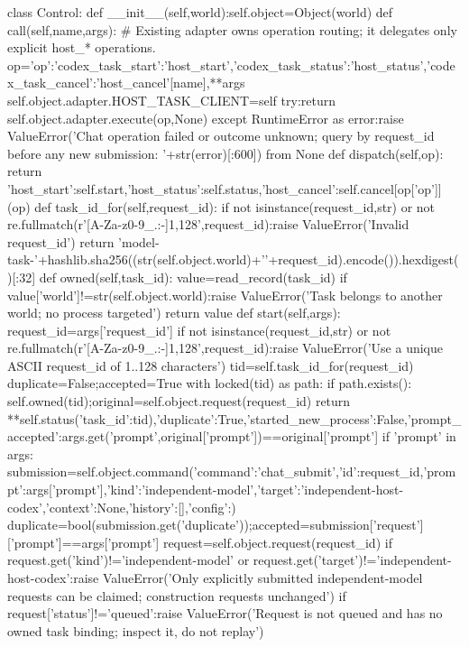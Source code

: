 class Control:
    def __init__(self,world):self.object=Object(world)
    def call(self,name,args):
        # Existing adapter owns operation routing; it delegates only explicit host_* operations.
        op={'op':{'codex_task_start':'host_start','codex_task_status':'host_status','codex_task_cancel':'host_cancel'}[name],**args}
        self.object.adapter.HOST_TASK_CLIENT=self
        try:return self.object.adapter.execute(op,None)
        except RuntimeError as error:raise ValueError('Chat operation failed or outcome unknown; query by request_id before any new submission: '+str(error)[:600]) from None
    def dispatch(self,op):
        return {'host_start':self.start,'host_status':self.status,'host_cancel':self.cancel}[op['op']](op)
    def task_id_for(self,request_id):
        if not isinstance(request_id,str) or not re.fullmatch(r'[A-Za-z0-9_.:-]{1,128}',request_id):raise ValueError('Invalid request_id')
        return 'model-task-'+hashlib.sha256((str(self.object.world)+'\0'+request_id).encode()).hexdigest()[:32]
    def owned(self,task_id):
        value=read_record(task_id)
        if value['world']!=str(self.object.world):raise ValueError('Task belongs to another world; no process targeted')
        return value
    def start(self,args):
        request_id=args['request_id']
        if not isinstance(request_id,str) or not re.fullmatch(r'[A-Za-z0-9_.:-]{1,128}',request_id):raise ValueError('Use a unique ASCII request_id of 1..128 characters')
        tid=self.task_id_for(request_id)
        duplicate=False;accepted=True
        with locked(tid) as path:
            if path.exists():
                self.owned(tid);original=self.object.request(request_id)
                return {**self.status({'task_id':tid}),'duplicate':True,'started_new_process':False,'prompt_accepted':args.get('prompt',original['prompt'])==original['prompt']}
            if 'prompt' in args:
                submission=self.object.command({'command':'chat_submit','id':request_id,'prompt':args['prompt'],'kind':'independent-model','target':'independent-host-codex','context':None,'history':[],'config':{}})
                duplicate=bool(submission.get('duplicate'));accepted=submission['request']['prompt']==args['prompt']
            request=self.object.request(request_id)
            if request.get('kind')!='independent-model' or request.get('target')!='independent-host-codex':raise ValueError('Only explicitly submitted independent-model requests can be claimed; construction requests unchanged')
            if request['status']!='queued':raise ValueError('Request is not queued and has no owned task binding; inspect it, do not replay')
